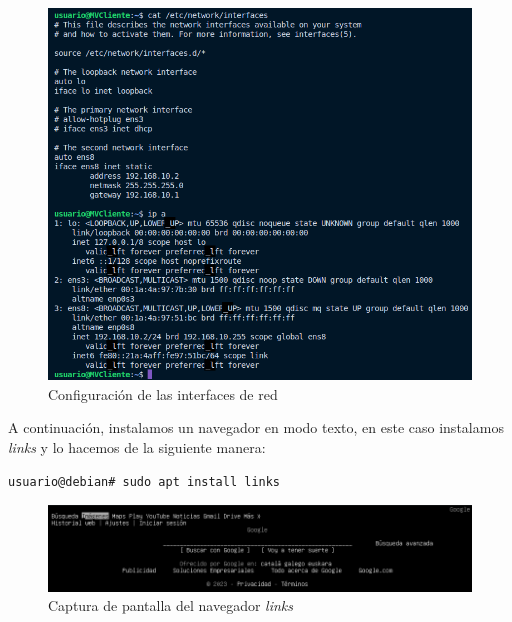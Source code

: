 \documentclass{report}
\begin{document}
\begin{figure}[H]
  \centering
  \includegraphics[scale=0.65]{img/configuracion_interfaces_cliente.png}
  \caption{Configuración de las interfaces de red}
  \label{fig:configuracion_interfaces_cliente}
\end{figure}

A continuación, instalamos un navegador en modo texto, en este caso instalamos \emph{links} y lo hacemos de la siguiente manera:

\begin{verbatim}
usuario@debian# sudo apt install links
  \end{verbatim}

\begin{figure}[H]
  \centering
  \includegraphics[scale=0.65]{img/links_google.png}
  \caption{Captura de pantalla del navegador \emph{links}}
  \label{fig:links}
\end{figure}
\end{document}
